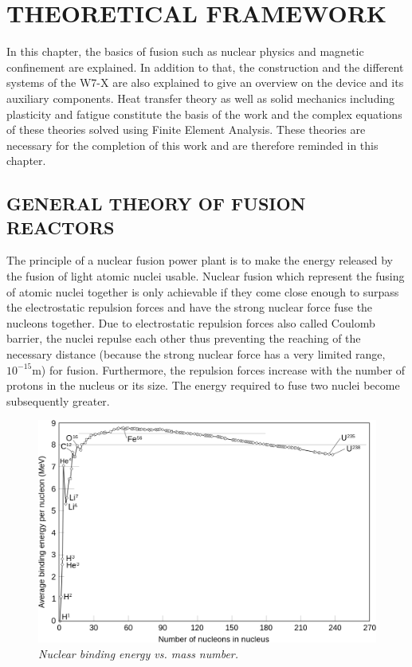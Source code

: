 \chapter{THEORETICAL FRAMEWORK}
\normalsize{In this chapter, the basics of fusion such as nuclear physics and magnetic confinement are explained. In addition to that, the construction and the different systems of the W7-X are also explained to give an overview on the device and its auxiliary components. Heat transfer theory as well as solid mechanics including plasticity and fatigue constitute the basis of the work and the complex equations of these theories solved using Finite Element Analysis. These theories are necessary for the completion of this work and are therefore reminded in this chapter.}
\section{GENERAL THEORY OF FUSION REACTORS}
\normalsize{The principle of a nuclear fusion power plant is to make the energy released by the fusion of light atomic nuclei usable. Nuclear fusion which represent the fusing of atomic nuclei together is only achievable if they come close enough to surpass the electrostatic repulsion forces and have the strong nuclear force fuse the nucleons together. Due to electrostatic repulsion forces also called Coulomb barrier, the nuclei repulse each other thus preventing the reaching of the necessary distance (because the strong nuclear force has a very limited range, ~$10^{-15}$m) \cite{diekmann_energie:_2014}\cite{Freidberg_2007} for fusion. Furthermore, the repulsion forces increase with the number of protons in the nucleus or its size. The energy required to fuse two nuclei become subsequently greater.}
\\
\begin{figure}[h!]
    \label{fig_2_1} 
    \centering
    \includegraphics[width=.9\textwidth]{figures/fig_1.png}
    \caption{\it Nuclear binding energy vs. mass number.}
\end{figure}
